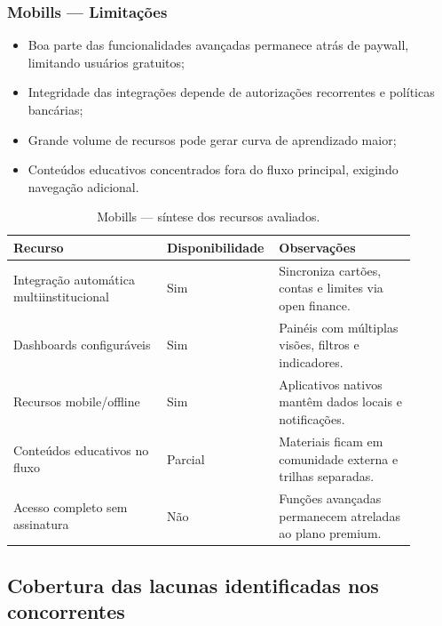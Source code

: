 \subsubsection*{Mobills — Limitações}
\begin{itemize}
    \item Boa parte das funcionalidades avançadas permanece atrás de pay\-wall, limitando usuários gratuitos;
    \item Integridade das integrações depende de autorizações recorrentes e políticas bancárias;
    \item Grande volume de recursos pode gerar curva de aprendizado maior;
    \item Conteúdos educativos concentrados fora do fluxo principal, exigindo navegação adicional.
\end{itemize}

\begin{table}[H]
\centering
\caption{Mobills — síntese dos recursos avaliados.}
\label{tab:mobills_comparativo}
\begin{tabular}{p{0.37\linewidth}p{0.2\linewidth}p{0.33\linewidth}}
\hline
\textbf{Recurso} & \textbf{Disponibilidade} & \textbf{Observações} \\
\hline
Integração automática multiinstitucional & Sim & Sincroniza cartões, contas e limites via open finance. \\
Dashboards configuráveis & Sim & Painéis com múltiplas visões, filtros e indicadores. \\
Recursos mobile/offline & Sim & Aplicativos nativos mantêm dados locais e notificações. \\
Conteúdos educativos no fluxo & Parcial & Materiais ficam em comunidade externa e trilhas separadas. \\
Acesso completo sem assinatura & Não & Funções avançadas permanecem atreladas ao plano premium. \\
\hline
\end{tabular}
\end{table}

\subsection{Cobertura das lacunas identificadas nos concorrentes}

